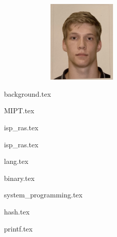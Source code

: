\documentclass[11pt]{article}
\begin{document}
\begin{figure}[t]
    \noindent 
    \begin{figure}
        \begin{flushright}
            \includegraphics[width=4cm,height=4cm,keepaspectratio]{components/for_CV.jpg}
        \end{flushright}
    \end{figure}
\end{figure}

\noindent

{background.tex}


{MIPT.tex}


{isp_ras.tex}


{isp_ras.tex}




{lang.tex}

{binary.tex}

{system_programming.tex}



{hash.tex}


{printf.tex}

\end{document}
